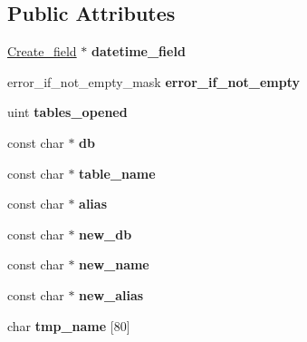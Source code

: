 \subsection*{Public Attributes}
\begin{DoxyCompactItemize}
\item 
\mbox{\label{classAlter__table__ctx_ae067139c4cbd99eaf2bf13fc25cc5164}} 
\mbox{\hyperlink{classCreate__field}{Create\+\_\+field}} $\ast$ {\bfseries datetime\+\_\+field}
\item 
\mbox{\label{classAlter__table__ctx_ad9d301dd726a019057e5727efb6aecc7}} 
error\+\_\+if\+\_\+not\+\_\+empty\+\_\+mask {\bfseries error\+\_\+if\+\_\+not\+\_\+empty}
\item 
\mbox{\label{classAlter__table__ctx_af6b533dfd72e46fb45acdcbb21f612c9}} 
uint {\bfseries tables\+\_\+opened}
\item 
\mbox{\label{classAlter__table__ctx_abc5e82c86c34cfe18fee44cfb0b7b677}} 
const char $\ast$ {\bfseries db}
\item 
\mbox{\label{classAlter__table__ctx_a253d9d734fd826e3443d2c4a3dbc0980}} 
const char $\ast$ {\bfseries table\+\_\+name}
\item 
\mbox{\label{classAlter__table__ctx_af9f3474ecca33eb88d168ed7d5591f29}} 
const char $\ast$ {\bfseries alias}
\item 
\mbox{\label{classAlter__table__ctx_ab0b8e46a3797795ba3fdaa0aa14c42c1}} 
const char $\ast$ {\bfseries new\+\_\+db}
\item 
\mbox{\label{classAlter__table__ctx_a56b33c5282d7936d8cf85c7278d8ac38}} 
const char $\ast$ {\bfseries new\+\_\+name}
\item 
\mbox{\label{classAlter__table__ctx_ada294bf1a6945f2a01b0e095ab119032}} 
const char $\ast$ {\bfseries new\+\_\+alias}
\item 
\mbox{\label{classAlter__table__ctx_a7672810839a522a759b933834756d3a0}} 
char {\bfseries tmp\+\_\+name} \mbox{[}80\mbox{]}
\end{DoxyCompactItemize}
